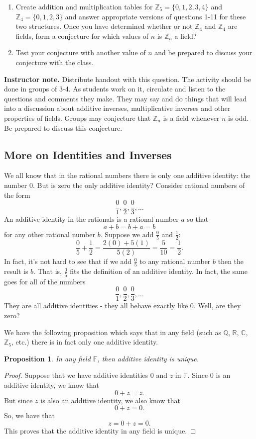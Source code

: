 \documentclass[11pt]{article}
\newcommand\smallnote[1]
	{\begin{mdframed}\raggedright  {\bf Instructor note.} {#1} \end{mdframed}}
\newenvironment{task}
	{\begin{mdframed}[linecolor=lightgray, linewidth=3pt]\raggedright}
	{\end{mdframed}}
\newtheorem{proposition}[theorem]{Proposition}
\theoremstyle{definition}
\begin{document}
\begin{task}
\begin{enumerate}
      \item Create addition and multiplication tables for $\mathbb{Z}_5 = \{0,1,2,3,4\}$ and $\mathbb{Z}_4=\{0,1,2,3\}$ and answer
        appropriate versions of questions 1-11 for these two structures. Once you have determined whether or not $\mathbb{Z}_4$ and 
        $\mathbb{Z}_4$ are fields, form a conjecture for which values of $n$ is $\mathbb{Z}_n$ a field?
      \item Test your conjecture with another value of $n$ and be prepared to discuss your conjecture with the class.
    \end{enumerate}
\end{task}

\smallnote{
Distribute handout with this question. The activity should be done in groups of 3-4. As students work on it, circulate and listen to the 
questions and comments they make. They may say and do things that will lead into a discussion about additive inverses, multiplicative 
inverses and other properties of fields. Groups may conjecture that $\mathbb{Z}_n$ is a field whenever $n$ is odd. Be prepared to discuss
this conjecture.} 

\subsection{More on Identities and Inverses}

We all know that in the rational numbers there is only one additive identity: the number 0. But is zero the only additive identity? Consider rational numbers of the
form
\[ \frac{0}{1}, \frac{0}{2}, \frac{0}{3}, \dots \]
An additive identity in the rationals is a rational number $a$ so that
\[ a + b = b + a = b \]
for any other rational number $b$. Suppose we add $\frac{0}{5}$ and $\frac{1}{2}$:
\[ \frac{0}{5} + \frac{1}{2} = \frac{2(0)+5(1)}{5(2)} = \frac{5}{10} = \frac{1}{2}. \]
In fact, it's not hard to see that if we add $\frac{0}{5}$ to any rational number $b$ then the result is $b$.
That is, $\frac{0}{5}$ fits the definition of an additive identity. In fact, the same goes for all of the numbers
\[ \frac{0}{1}, \frac{0}{2}, \frac{0}{3}, \dots \]
They are all additive identities - they all behave exactly like 0. Well, are they zero?

We have the following proposition which says that in any field (such as $\mathbb{Q}$, $\mathbb{R}$, $\mathbb{C}$, $\mathbb{Z}_5$, etc.) there is in fact
only one additive identity.

\begin{proposition}
  In any field $\mathbb{F}$, then additive identity is unique.
\end{proposition}
\begin{proof}
  Suppose that we have additive identities $0$ and $z$ in $\mathbb{F}$. Since $0$ is an additive identity, we know that
  \[ 0 + z = z.\]
  But since $z$ is also an additive identity, we also know that
  \[ 0 + z = 0.\]
  So, we have that
  \[ z = 0 + z = 0.\]
  This proves that the additive identity in any field is unique.
\end{proof}
\end{document}
